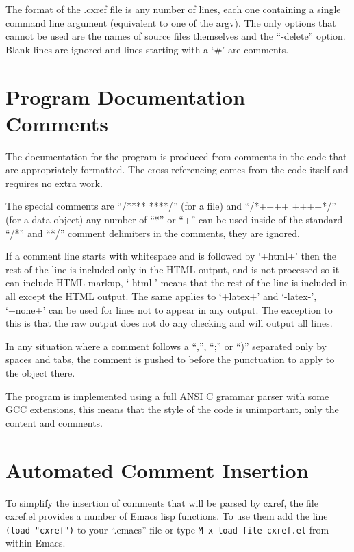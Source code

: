 The format of the .cxref file is any number of lines, each one containing a
single command line argument (equivalent to one of the argv).  The only options
that cannot be used are the names of source files themselves and the ``-delete''
option.  Blank lines are ignored and lines starting with a `\#' are comments.

\section{Program Documentation Comments}

The documentation for the program is produced from comments in the code that are
appropriately formatted.  The cross referencing comes from the code itself and
requires no extra work.

The special comments are ``/**** ****/'' (for a file) and ``/*++++ ++++*/'' (for a
data object) any number of ``*'' or ``+'' can be used inside of the standard ``/*''
and ``*/'' comment delimiters in the comments, they are ignored.

If a comment line starts with whitespace and is followed by `+html+' then the
rest of the line is included only in the HTML output, and is not processed so it
can include HTML markup, `-html-' means that the rest of the line is included in
all except the HTML output.  The same applies to `+latex+' and `-latex-',
`+none+' can be used for lines not to appear in any output.  The exception to
this is that the raw output does not do any checking and will output all lines.

In any situation where a comment follows a ``,'', ``;'' or ``)'' separated only by
spaces and tabs, the comment is pushed to before the punctuation to apply to
the object there.

The program is implemented using a full ANSI C grammar parser with some GCC
extensions, this means that the style of the code is unimportant, only the
content and comments.

\section{Automated Comment Insertion}

To simplify the insertion of comments that will be parsed by cxref, the file
cxref.el provides a number of Emacs lisp functions.  To use them add the line
{\tt (load "cxref")} to your ``.emacs'' file or type {\tt M-x load-file cxref.el} from
within Emacs.


